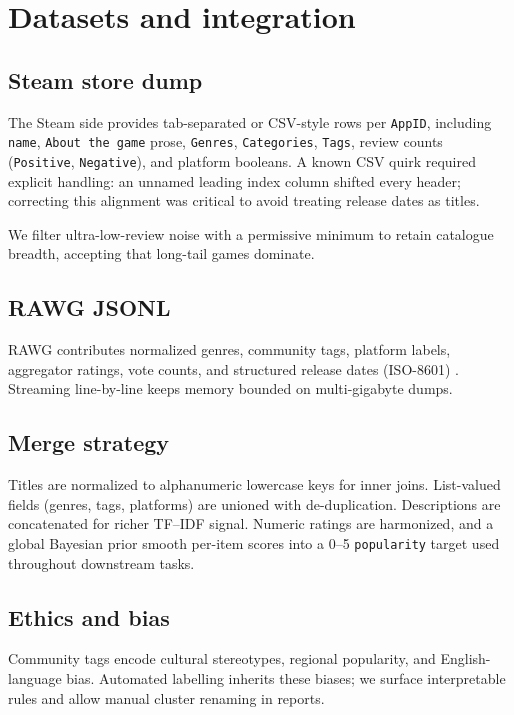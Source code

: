 \section{Datasets and integration}
\subsection{Steam store dump}
The Steam side provides tab-separated or CSV-style rows per \texttt{AppID}, including \texttt{name}, \texttt{About the game} prose, \texttt{Genres}, \texttt{Categories}, \texttt{Tags}, review counts (\texttt{Positive}, \texttt{Negative}), and platform booleans. A known CSV quirk required explicit handling: an unnamed leading index column shifted every header; correcting this alignment was critical to avoid treating release dates as titles.

We filter ultra-low-review noise with a permissive minimum to retain catalogue breadth, accepting that long-tail games dominate.

\subsection{RAWG JSONL}
RAWG contributes normalized genres, community tags, platform labels, aggregator ratings, vote counts, and structured release dates (ISO-8601) \cite{rawg}. Streaming line-by-line keeps memory bounded on multi-gigabyte dumps.

\subsection{Merge strategy}
Titles are normalized to alphanumeric lowercase keys for inner joins. List-valued fields (genres, tags, platforms) are unioned with de-duplication. Descriptions are concatenated for richer TF--IDF signal. Numeric ratings are harmonized, and a global Bayesian prior smooth per-item scores into a 0--5 \texttt{popularity} target used throughout downstream tasks.

\subsection{Ethics and bias}
Community tags encode cultural stereotypes, regional popularity, and English-language bias. Automated labelling inherits these biases; we surface interpretable rules and allow manual cluster renaming in reports.
